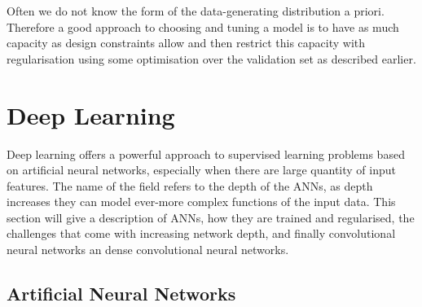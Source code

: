 Often we do not know the form of the data-generating distribution a priori. Therefore a good approach to choosing and tuning a model is to have as much capacity as design constraints allow and then restrict this capacity with regularisation using some optimisation over the validation set as described earlier.

\section{Deep Learning}

Deep learning offers a powerful approach to supervised learning problems based on artificial neural networks, especially when there are large quantity of input features. 
The name of the field refers to the depth of the ANNs, as depth increases they can model ever-more complex functions of the input data. 
This section will give a description of ANNs, how they are trained and regularised, the challenges that come with increasing network depth, and finally convolutional neural networks an dense convolutional neural networks.  

\subsection{Artificial Neural Networks}

